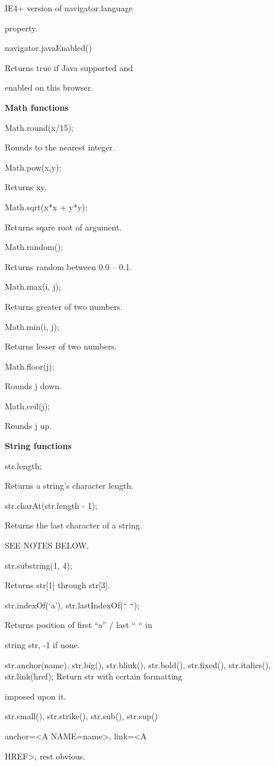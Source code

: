 \documentclass[
]{article}
\begin{document}
IE4+ version of navigator.language

property.

navigator.javaEnabled()

Returns true if Java supported and

enabled on this browser.

\textbf{Math functions}

Math.round(x/15);

Rounds to the nearest integer.

Math.pow(x,y);

Returns xy.

Math.sqrt(x*x + y*y);

Returns sqare root of argument.

Math.random();

Returns random between 0.0 -- 0.1.

Math.max(i, j);

Returns greater of two numbers.

Math.min(i, j);

Returns lesser of two numbers.

Math.floor(j);

Rounds j down.

Math.ceil(j);

Rounds j up.

\textbf{String functions}

str.length;

Returns a string's character length.

str.charAt(str.length - 1);

Returns the last character of a string.

SEE NOTES BELOW.

str.substring(1, 4);

Returns str{[}1{]} through str{[}3{]}.

str.indexOf(`a'), str.lastIndexOf(`` ``);

Returns position of first ``a'' / last `` `` in

string str, -1 if none.

str.anchor(name), str.big(), str.blink(), str.bold(), str.fixed(),
str.italics(), str.link(href); Return str with certain formatting

imposed upon it.

str.small(), str.strike(), str.sub(), str.sup()

anchor=\textless A NAME=name\textgreater, link=\textless A

HREF\textgreater, rest obvious.
\end{document}
